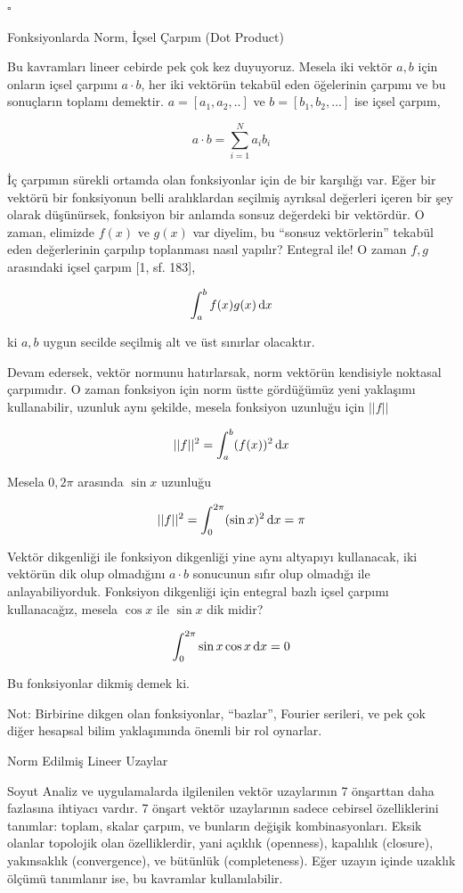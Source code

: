 \documentclass[12pt,fleqn]{article}\usepackage{../../common}
\begin{document}
$ \square $

Fonksiyonlarda Norm, İçsel Çarpım (Dot Product)

Bu kavramları lineer cebirde pek çok kez duyuyoruz. Mesela iki vektör
$a,b$ için onların içsel çarpımı $a \cdot b$, her iki vektörün tekabül
eden öğelerinin çarpımı ve bu sonuçların toplamı demektir. $a = [a_1,a_2,..]$
ve $b = [b_1,b_2,...]$ ise içsel çarpım,

$$
a \cdot b = \sum_{i=1}^{N} a_i b_i 
$$

İç çarpımın sürekli ortamda olan fonksiyonlar için de bir karşılığı var.  Eğer
bir vektörü bir fonksiyonun belli aralıklardan seçilmiş ayrıksal değerleri
içeren bir şey olarak düşünürsek, fonksiyon bir anlamda sonsuz değerdeki bir
vektördür. O zaman, elimizde $f(x)$ ve $g(x)$ var diyelim, bu ``sonsuz
vektörlerin'' tekabül eden değerlerinin çarpılıp toplanması nasıl yapılır?
Entegral ile! O zaman $f,g$ arasındaki içsel çarpım [1, sf. 183],

$$
\int_{a}^{b} f(x) g(x) \,\mathrm{d} x
$$

ki $a,b$ uygun secilde seçilmiş alt ve üst sınırlar olacaktır. 

Devam edersek, vektör normunu hatırlarsak, norm vektörün kendisiyle noktasal
çarpımıdır. O zaman fonksiyon için norm üstte gördüğümüz yeni yaklaşımı
kullanabilir, uzunluk aynı şekilde, mesela fonksiyon uzunluğu için $||f||$

$$
||f||^2 = \int _{a}^{b} (f(x))^2 \,\mathrm{d} x
$$

Mesela $0,2\pi$ arasında $\sin x$ uzunluğu

$$
||f||^2 = \int _{0}^{2\pi} (\sin x)^2 \,\mathrm{d} x = \pi
$$

Vektör dikgenliği ile fonksiyon dikgenliği yine aynı altyapıyı kullanacak, iki
vektörün dik olup olmadığını $a \cdot b$ sonucunun sıfır olup olmadığı ile
anlayabiliyorduk. Fonksiyon dikgenliği için entegral bazlı içsel çarpımı
kullanacağız, mesela $\cos x$ ile $\sin x$ dik midir?

$$
\int _{0}^{2\pi} \sin x \cos x \,\mathrm{d} x = 0
$$

Bu fonksiyonlar dikmiş demek ki.

Not: Birbirine dikgen olan fonksiyonlar, ``bazlar'', Fourier serileri, ve pek
çok diğer hesapsal bilim yaklaşımında önemli bir rol oynarlar.


Norm Edilmiş Lineer Uzaylar

Soyut Analiz ve uygulamalarda ilgilenilen vektör uzaylarının 7 önşarttan
daha fazlasına ihtiyacı vardır. 7 önşart vektör uzaylarının sadece cebirsel
özelliklerini tanımlar: toplam, skalar çarpım, ve bunların değişik
kombinasyonları. Eksik olanlar topolojik olan özelliklerdir, yani açıklık
(openness), kapalılık (closure), yakınsaklık (convergence), ve bütünlük
(completeness). Eğer uzayın içinde uzaklık ölçümü tanımlanır ise, bu
kavramlar kullanılabilir. 
\end{document}
